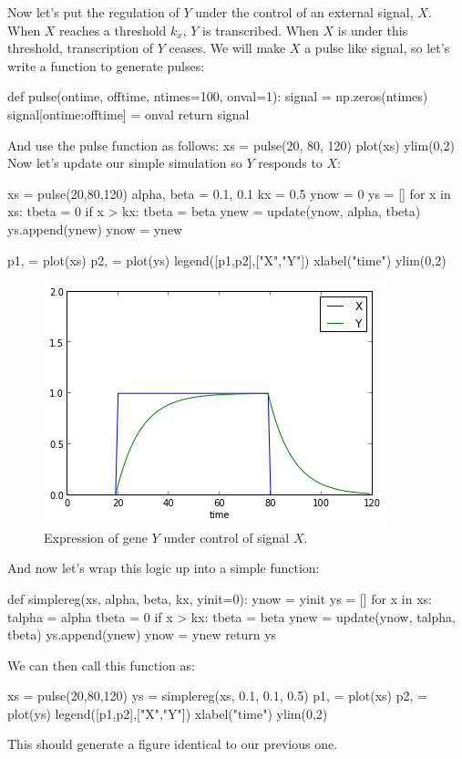 Now let's put the regulation of $Y$ under the control of an external signal, $X$. When $X$ reaches a threshold $k_x$, $Y$ is transcribed. When $X$ is under this threshold, transcription of $Y$ ceases. We will make $X$ a pulse like signal, so let's write a function to generate pulses:
%
\begin{python}
def pulse(ontime, offtime,  ntimes=100, onval=1):
    signal = np.zeros(ntimes)
    signal[ontime:offtime] = onval
    return signal
\end{python}
%
And use the pulse function as follows:
%
xs = pulse(20, 80, 120)
plot(xs)
ylim(0,2)
%
Now let's update our simple simulation so $Y$ responds to $X$:
%
\begin{python}
xs = pulse(20,80,120)
alpha, beta = 0.1, 0.1
kx = 0.5
ynow = 0
ys = []
for x in xs:
    tbeta = 0
    if x > kx:
        tbeta = beta
    ynew = update(ynow, alpha, tbeta)
    ys.append(ynew)
    ynow = ynew

p1, = plot(xs)
p2, = plot(ys)
legend([p1,p2],["X","Y"])
xlabel("time")
ylim(0,2)
\end{python}
%
\begin{figure}[!ht]
    \centering
    \includegraphics[width=0.33\columnwidth]{./figures/hands-on12/fig-pulse.png}
    \caption{Expression of gene $Y$ under control of signal $X$.}\label{fig:pulse}
\end{figure}
%
And now let's wrap this logic up into a simple function:
%
\begin{python}
def simplereg(xs, alpha, beta, kx, yinit=0):
    ynow = yinit
    ys = []
    for x in xs:
        talpha = alpha
        tbeta = 0
        if x > kx:
            tbeta = beta
        ynew = update(ynow, talpha, tbeta)
        ys.append(ynew)
        ynow = ynew
    return ys

\end{python}
%
We can then call this function as:
%
\begin{python}
xs = pulse(20,80,120)
ys = simplereg(xs, 0.1, 0.1, 0.5)
p1, = plot(xs)
p2, = plot(ys)
legend([p1,p2],["X","Y"])
xlabel("time")
ylim(0,2)
\end{python}
This should generate a figure identical to our previous one.

